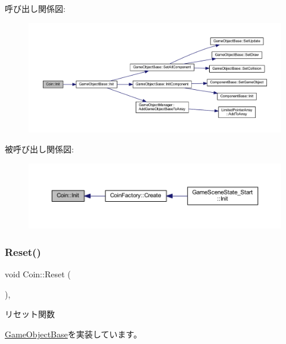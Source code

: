 呼び出し関係図\+:\nopagebreak
\begin{figure}[H]
\begin{center}
\leavevmode
\includegraphics[width=350pt]{class_coin_aecb007762f15ecc91cd6a699e60c2e19_cgraph}
\end{center}
\end{figure}
被呼び出し関係図\+:\nopagebreak
\begin{figure}[H]
\begin{center}
\leavevmode
\includegraphics[width=350pt]{class_coin_aecb007762f15ecc91cd6a699e60c2e19_icgraph}
\end{center}
\end{figure}
\mbox{\label{class_coin_a52c50229ce7c1e0f459e198adac70c8d}} 
\subsubsection{\texorpdfstring{Reset()}{Reset()}}
{\footnotesize\ttfamily void Coin\+::\+Reset (\begin{DoxyParamCaption}{ }\end{DoxyParamCaption})\hspace{0.3cm}{\ttfamily [override]}, {\ttfamily [virtual]}}



リセット関数 



\mbox{\hyperlink{class_game_object_base_a85c59554f734bcb09f1a1e18d9517dce}{Game\+Object\+Base}}を実装しています。



